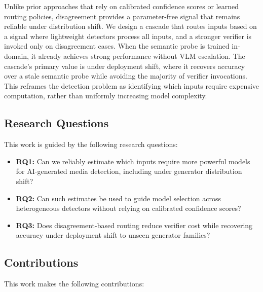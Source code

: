 \documentclass{ieeeaccess}
\begin{document}
Unlike prior approaches that rely on calibrated confidence scores or learned routing policies, disagreement provides a parameter-free signal that remains reliable under distribution shift. We design a cascade that routes inputs based on a signal where lightweight detectors process all inputs, and a stronger verifier is invoked only on disagreement cases. When the semantic probe is trained in-domain, it already achieves strong performance without VLM escalation. The cascade's primary value is under deployment shift, where it recovers
accuracy over a stale semantic probe while avoiding the majority of verifier invocations. This reframes the detection problem as identifying which inputs require expensive computation, rather than uniformly increasing model complexity.

\subsection{Research Questions}

This work is guided by the following research questions:

\begin{itemize}
    \item \textbf{RQ1:} Can we reliably estimate which inputs require more powerful models
    for AI-generated media detection, including under generator distribution shift?
    \item \textbf{RQ2:} Can such estimates be used to guide model selection across heterogeneous detectors without relying on calibrated confidence scores?
    \item \textbf{RQ3:} Does disagreement-based routing reduce verifier cost while recovering accuracy under deployment shift to unseen generator families?
\end{itemize}

\subsection{Contributions}

This work makes the following contributions:
\end{document}
